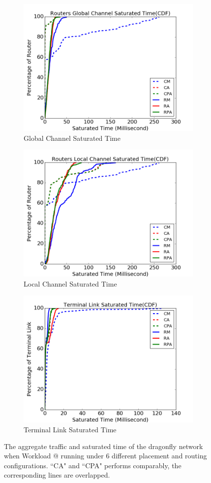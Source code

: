 \documentclass[conference,compsoc]{IEEEtran}
\makeatletter
\newcommand{\Rmnum}[1]{\expandafter\@slowromancap\romannumeral #1@}
\makeatother
\begin{document}
\begin{figure}[t!]
    \centering   
    \begin{subfigure}[t]{0.32\textwidth}
        \centering
        \includegraphics[height=1.8 in]{wkld/gc-stime}
        \caption{Global Channel Saturated Time}
        \label{fig:global-channel-stime}
    \end{subfigure}\hfill
     \hspace{1em}%
    \begin{subfigure}[t]{0.32\textwidth}
        \centering
        \includegraphics[height=1.8 in]{wkld/lc-stime}
        \caption{Local Channel Saturated Time}
        \label{fig:local-channel-stime}
    \end{subfigure}\hfill
    \hspace{1em}%
    \begin{subfigure}[t]{0.32\textwidth}
        \centering
        \includegraphics[height=1.8 in]{wkld/tl-stime}
        \caption{Terminal Link Saturated Time}
        \label{fig:terminal-link-stime}
    \end{subfigure}%
   \caption{The aggregate traffic and saturated time of the dragonfly network when Workload \Rmnum{1} running under 6 different placement and routing configurations. ``CA" and ``CPA" performs comparably, the corresponding lines are overlapped. }
   \label{fig:wkld-network-traffic-stime}
\end{figure}
\end{document}
